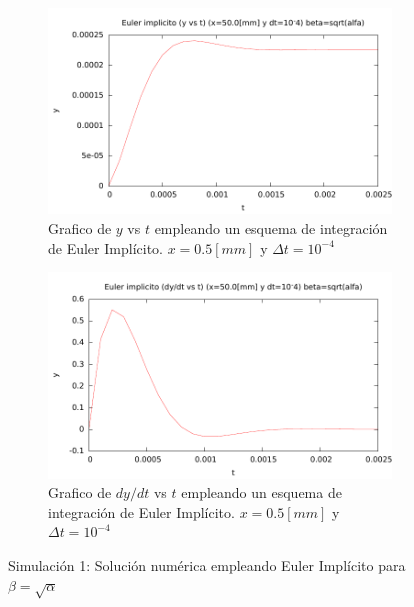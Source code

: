
\begin{center}
\begin{figure} [H]
	\begin{subfigure}[b]{0.8\textwidth}
		\centering
		\includegraphics{./parte3/graficos/grafico_euler_S1_y_b1.pdf}
		\caption{Grafico de $y$ vs $t$ empleando un esquema de integración de Euler Implícito. $x=0.5[mm]$ y $\Delta t=10^{-4}$} 
		\label{fig:eulerS1b1_y}
	\end{subfigure}
	
	\begin{subfigure}[b]{0.8\textwidth}
		\includegraphics{./parte3/graficos/grafico_euler_S1_dy_b1.pdf}
		\caption{Grafico de $dy/dt$ vs $t$ empleando un esquema de integración de Euler Implícito. $x=0.5[mm]$ y $\Delta t=10^{-4}$} 
		\label{fig:eulerS1b1_dy}
	\end{subfigure}
\caption{Simulación 1: Solución numérica empleando Euler Implícito para $\beta=\sqrt{\alpha}$ } \label{euler_S1_b1}
\end{figure}
\end{center}

